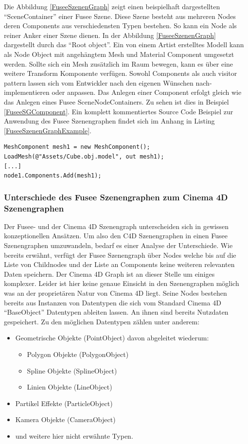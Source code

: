 \documentclass[pagesize, paper=a4, fontsize=12pt, titlepage=true, headings=small, headnosepline, abstractoff, liststotoc, nochapterprefix, plainheadsepline, twoside]{scrreprt}
\begin{document}
Die Abbildung \ref{FuseeSzenenGraph} zeigt einen beispielhaft dargestellten “SceneContainer” einer Fusee Szene. Diese Szene besteht aus mehreren Nodes deren Components aus verschiedensten Typen bestehen. So kann ein Node als reiner Anker einer Szene dienen. In der Abbildung \ref{FuseeSzenenGraph} dargestellt durch das “Root object”. Ein von einem Artist erstelltes Modell kann als Node Object mit angehängtem Mesh und Material Component umgesetzt werden. Sollte sich ein Mesh zusätzlich im Raum bewegen, kann es über eine weitere Transform Komponente verfügen. Sowohl Components als auch visitor pattern lassen sich vom Entwickler nach den eigenen Wünschen nach-implementieren oder anpassen. Das Anlegen einer Component erfolgt gleich wie das Anlegen eines Fusee SceneNodeContainers. Zu sehen ist dies in Beispiel \ref{FuseeSGComponent}. Ein komplett kommentiertes Source Code Beispiel zur Anwendung des Fusee Szenengraphen findet sich im Anhang in Listing \ref{FuseeSzenenGraphExample}.

\begin{lstlisting}[caption = Erstellen einer Component aus einem Mesh Objekt und Anhängen an einen Fusee SceneNodeContainer., label=FuseeSGComponent]
MeshComponent mesh1 = new MeshComponent();
LoadMesh(@"Assets/Cube.obj.model", out mesh1);
[...]
node1.Components.Add(mesh1);
\end{lstlisting}

\subsubsection{Unterschiede des Fusee Szenengraphen zum Cinema 4D Szenengraphen}
Der Fusee- und der Cinema 4D Szenengraph unterscheiden sich in gewissen konzeptionellen Ansätzen. Um also den C4D Szenengraphen in einen Fusee Szenengraphen umzuwandeln, bedarf es einer Analyse der Unterschiede.
Wie bereits erwähnt, verfügt der Fusee Szenengraph über Nodes welche bis auf die Liste von Childnodes und der Liste an Components keine weiteren relevanten Daten speichern. Der Cinema 4D Graph ist an dieser Stelle um einiges komplexer. Leider ist hier keine genaue Einsicht in den Szenengraphen möglich was an der proprietären Natur von Cinema 4D liegt. Seine Nodes bestehen bereits aus Instanzen von Datentypen die sich vom Standard Cinema 4D “BaseObject” Datentypen ableiten lassen. An ihnen sind bereits Nutzdaten gespeichert. Zu den möglichen Datentypen zählen unter anderem:
\begin{itemize}
\item Geometrische Objekte (PointObject) davon abgeleitet wiederum:
	\begin{itemize}
	\item Polygon Objekte (PolygonObject)
	\item Spline Objekte (SplineObject)
	\item Linien Objekte (LineObject)
	\end{itemize}
\item Partikel Effekte (ParticleObject)
\item Kamera Objekte (CameraObject)
\item und weitere hier nicht erwähnte Typen.
\end{itemize}
\end{document}
